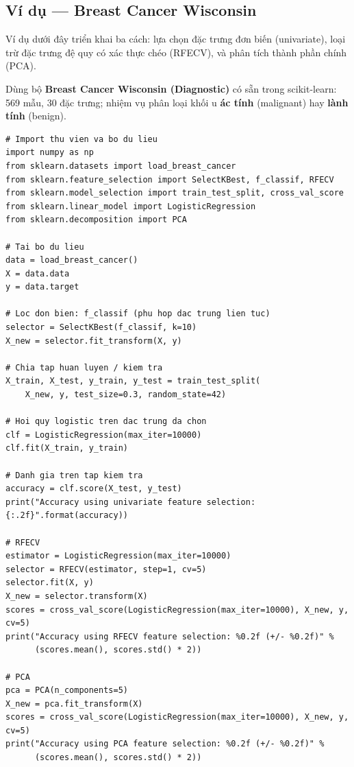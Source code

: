 \subsection{Ví dụ --- Breast Cancer Wisconsin}

\begin{dongco}[title={Bối cảnh ví dụ}]
Ví dụ dưới đây triển khai ba cách: lựa chọn đặc trưng đơn biến (univariate), loại trừ đặc trưng đệ quy có xác thực chéo (RFECV), và phân tích thành phần chính (PCA).
\end{dongco}

\begin{ynghia}[title={Bộ dữ liệu Breast Cancer}]
Dùng bộ \textbf{Breast Cancer Wisconsin (Diagnostic)} có sẵn trong scikit-learn: 569 mẫu, 30 đặc trưng; nhiệm vụ phân loại khối u \textbf{ác tính} (malignant) hay \textbf{lành tính} (benign).
\end{ynghia}

\begin{vidu}[title={Mã Python đầy đủ}]
\begin{lstlisting}
# Import thu vien va bo du lieu
import numpy as np
from sklearn.datasets import load_breast_cancer
from sklearn.feature_selection import SelectKBest, f_classif, RFECV
from sklearn.model_selection import train_test_split, cross_val_score
from sklearn.linear_model import LogisticRegression
from sklearn.decomposition import PCA

# Tai bo du lieu
data = load_breast_cancer()
X = data.data
y = data.target

# Loc don bien: f_classif (phu hop dac trung lien tuc)
selector = SelectKBest(f_classif, k=10)
X_new = selector.fit_transform(X, y)

# Chia tap huan luyen / kiem tra
X_train, X_test, y_train, y_test = train_test_split(
    X_new, y, test_size=0.3, random_state=42)

# Hoi quy logistic tren dac trung da chon
clf = LogisticRegression(max_iter=10000)
clf.fit(X_train, y_train)

# Danh gia tren tap kiem tra
accuracy = clf.score(X_test, y_test)
print("Accuracy using univariate feature selection: {:.2f}".format(accuracy))

# RFECV
estimator = LogisticRegression(max_iter=10000)
selector = RFECV(estimator, step=1, cv=5)
selector.fit(X, y)
X_new = selector.transform(X)
scores = cross_val_score(LogisticRegression(max_iter=10000), X_new, y, cv=5)
print("Accuracy using RFECV feature selection: %0.2f (+/- %0.2f)" %
      (scores.mean(), scores.std() * 2))

# PCA
pca = PCA(n_components=5)
X_new = pca.fit_transform(X)
scores = cross_val_score(LogisticRegression(max_iter=10000), X_new, y, cv=5)
print("Accuracy using PCA feature selection: %0.2f (+/- %0.2f)" %
      (scores.mean(), scores.std() * 2))
\end{lstlisting}
\end{vidu}

